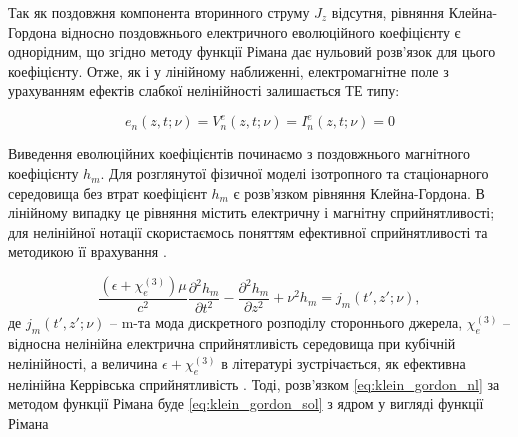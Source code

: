Так як поздовжня компонента вторинного струму $ J_z $ відсутня, рівняння 
Клейна-Гордона відносно поздовжнього електричного еволюційного коефіцієнту 
є однорідним, що згідно методу функції Рімана дає нульовий розв'язок для
цього коефіцієнту. Отже, як і у лінійному наближенні, електромагнітне поле 
з урахуванням ефектів слабкої нелінійності залишається ТЕ типу:

%
%
%
%
%
\begin{equation} \label{eq:e_evolution}
e_n (z, t; \nu) = V_n^e (z, t; \nu) = I_n^e (z, t; \nu) = 0
\end{equation}

Виведення еволюційних коефіцієнтів починаємо з поздовжнього 
магнітного коефіцієнту $ h_m $. Для розглянутої фізичної моделі ізотропного
та стаціонарного середовища без втрат коефіцієнт $ h_m $ є розв'язком 
рівняння Клейна-Гордона. В лінійному випадку це рівняння містить електричну 
і магнітну сприйнятливості; для нелінійної нотації скористаємось поняттям 
ефективної сприйнятливості та методикою її врахування \cite{imp:Ziolkowski1993}.

\begin{equation} \label{eq:klein_gordon_nl}
\frac{(\epsilon + \chi_e^{(3)}) \mu}{c^2} 
\frac{\partial^2 h_m}{\partial t^2} - 
\frac{\partial^2 h_m}{\partial z^2} + 
\nu^2 h_m = j_m (t',z'; \nu),
\end{equation}
%
де $ j_m (t',z'; \nu) $ -- m-та мода дискретного розподілу стороннього 
джерела, $ \chi_e^{(3)} $ -- відносна нелінійна електрична сприйнятливість 
середовища при кубічній нелінійності, а величина $ \epsilon + \chi_e^{(3)} $ в 
літературі зустрічається, як ефективна нелінійна Керрівська сприйнятливість 
\cite{imp:Ziolkowski1993}. Тоді, розв'язком \eqref{eq:klein_gordon_nl} за 
методом функції Рімана буде \eqref{eq:klein_gordon_sol} з ядром у вигляді 
функції Рімана

